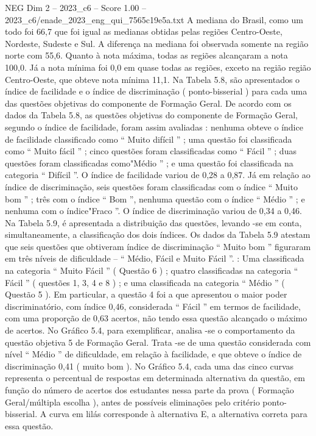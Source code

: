 \begin{textsample}{NEG Dim 2 – 2023\_c6 – Score 1.00 – 2023\_c6/enade\_2023\_eng\_qui\_7565c19e5a.txt}
A mediana do Brasil, como um todo foi 66,7 que foi igual as medianas obtidas pelas regiões Centro-Oeste, Nordeste, Sudeste e Sul.
A diferença na mediana foi observada somente na região norte com 55,6.
Quanto à nota máxima, todas as regiões alcançaram a nota 100,0.
Já a nota mínima foi 0,0 em quase todas as regiões, exceto na região região Centro-Oeste, que obteve nota mínima 11,1.
Na Tabela 5.8, são apresentados o índice de facilidade e o índice de discriminação ( ponto-bisserial ) para cada uma das questões objetivas do componente de Formação Geral.
De acordo com os dados da Tabela 5.8, as questões objetivas do componente de Formação Geral, segundo o índice de facilidade, foram assim avaliadas : nenhuma obteve o índice de facilidade classificado como “ Muito difícil ” ; uma questão foi classificada como “ Muito fácil ” ; cinco questões foram classificadas como “ Fácil ” ; duas questões foram classificadas como"Médio ” ; e uma questão foi classificada na categoria “ Difícil ”.
O índice de facilidade variou de 0,28 a 0,87.
Já em relação ao índice de discriminação, seis questões foram classificadas com o índice “ Muito bom ” ; três com o índice “ Bom ”, nenhuma questão com o índice “ Médio ” ; e nenhuma com o índice"Fraco ”.
O índice de discriminação variou de 0,34 a 0,46.
Na Tabela 5.9, é apresentada a distribuição das questões, levando -se em conta, simultaneamente, a classificação dos dois índices.
Os dados da Tabela 5.9 atestam que seis questões que obtiveram índice de discriminação “ Muito bom ” figuraram em três níveis de dificuldade – “ Médio, Fácil e Muito Fácil ”. : Uma classificada na categoria “ Muito Fácil ” ( Questão 6 ) ; quatro classificadas na categoria “ Fácil ” ( questões 1, 3, 4 e 8 ) ; e uma classificada na categoria “ Médio ” ( Questão 5 ).
Em particular, a questão 4 foi a que apresentou o maior poder discriminatório, com índice 0,46, considerada “ Fácil ” em termos de facilidade, com uma proporção de 0,63 acertos, não tendo essa questão alcançado o máximo de acertos.
No Gráfico 5.4, para exemplificar, analisa -se o comportamento da questão objetiva 5 de Formação Geral.
Trata -se de uma questão considerada com nível “ Médio ” de dificuldade, em relação à facilidade, e que obteve o índice de discriminação 0,41 ( muito bom ).
No Gráfico 5.4, cada uma das cinco curvas representa o percentual de respostas em determinada alternativa da questão, em função do número de acertos dos estudantes nessa parte da prova ( Formação Geral/múltipla escolha ), antes de possíveis eliminações pelo critério ponto-bisserial.
A curva em lilás corresponde à alternativa E, a alternativa correta para essa questão.

\end{textsample}

